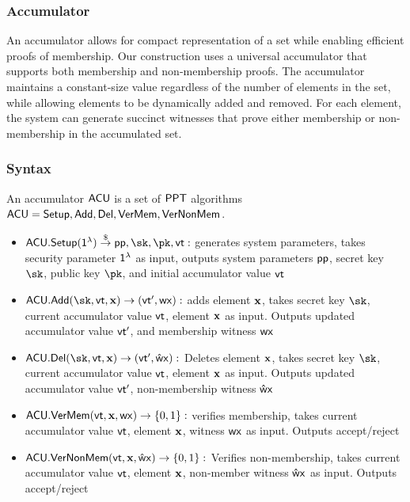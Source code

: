 \subsubsection{Accumulator}
An accumulator allows for compact representation of a set while enabling efficient proofs of membership. Our construction uses a universal accumulator that supports both membership and non-membership proofs. The accumulator maintains a constant-size value regardless of the number of elements in the set, while allowing elements to be dynamically added and removed. For each element, the system can generate succinct witnesses that prove either membership or non-membership in the accumulated set.

\subsubsection{Syntax}
An accumulator $\mathsf{ACU}$ is a set of $\mathsf{PPT}$ algorithms $\mathsf{ACU} = \mathsf{Setup, Add, Del, VerMem, VerNonMem}$. 
\begin{itemize}
    \item $\acusetup(\secparam) \torand \ppar, \sk, \pk, \vt:$ generates system parameters, takes security parameter $\mathsf{1^{\lambda}}$ as input, outputs system parameters $\mathsf{pp}$, secret key $\sk$, public key $\pk$, and initial accumulator value $\mathsf{vt}$
    
    \item $\acuadd(\sk, \vt, \x) \to (\vt', \wx):$ adds element $\textbf{x}$, takes secret key $\sk$, current accumulator value $\mathsf{vt}$, element $\textbf{x}$ as input. Outputs updated accumulator value $\mathsf{vt}'$, and membership witness $\mathsf{wx}$
    
    \item $\acudel(\sk, \vt, \x) \to (\vt', \wxhat):$ Deletes element $\textbf{x}$, takes secret key $\sk$, current accumulator value $\mathsf{vt}$, element $\textbf{x}$ as input. Outputs updated accumulator value $\mathsf{vt}'$, non-membership witness $\mathsf{\hat{w}x}$ 
    
    \item $\mathsf{ACU.VerMem}(\mathsf{vt}, \textbf{x}, \mathsf{wx}) \to \{0,1\}:$ verifies membership, takes current accumulator value $\mathsf{vt}$, element $\textbf{x}$, witness $\mathsf{wx}$ as input. Outputs accept/reject
    
    \item $\mathsf{ACU.VerNonMem}(\mathsf{vt}, \textbf{x}, \mathsf{\hat{w}x}) \to \{0,1\}:$ Verifies non-membership, takes current accumulator value $\mathsf{vt}$, element $\textbf{x}$, non-member witness $\mathsf{\hat{w}x}$ as input. Outputs accept/reject
\end{itemize}

